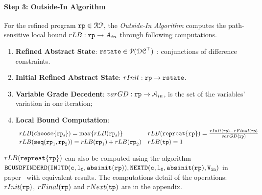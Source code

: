   \paragraph{Step 3: Outside-In Algorithm}
  For the refined program $\mathtt{rp} \in \mathcal{RP}$, the \emph{Outside-In Algorithm}
  computes the path-sensitive local bound 
  $rLB: \mathtt{rp} \to \mathcal{A}_{in}$ through following computations.
  \begin{enumerate}
  \item \textbf{{Refined Abstract State}}: 
  $\mathtt{rstate} \in \mathcal{P}(\mathcal{DC}^{\top})$ : conjunctions of difference constraints.
  \item \textbf{Initial Refined Abstract State}: $rInit : \mathtt{rp} \to \mathtt{rstate} $.
  \item \textbf{Variable Grade Decedent}: $varGD : \mathtt{rp} \to \mathcal{A}_{in}$, is the set of the variables' variation in one iteration;
  \item \textbf{Local Bound Computation}: 
  \[
   \begin{array}{ll}
   rLB(\mathtt{choose}\{\mathtt{rp}_i\}) = \max\{rLB(\mathtt{rp}_i)\}
   &
   rLB(\mathtt{repreat}\{\mathtt{rp}\}) = \frac{rInit(\mathtt{rp}) - rFinal(\mathtt{rp})}{varGD(\mathtt{rp})}
   \\
   rLB(\mathtt{seq}(\mathtt{rp}_1, \mathtt{rp}_2)) = rLB(\mathtt{rp}_1)+ rLB( \mathtt{rp}_2)
   &
   rLB(\mathtt{tp}) = 1
   \end{array}
  \]
  \end{enumerate}
  $rLB(\mathtt{repreat}\{\mathtt{rp}\})$ can also be computed using the algorithm 
  $\mathtt{BOUNDFINDERD(INITD(c, l_0, \mathtt{abs}{\mathtt{init}}(\mathtt{rp})), NEXTD(c, l_0, \mathtt{abs}{\mathtt{init}}(\mathtt{rp}), V_{\mathtt{in}} )}$ 
  in paper~\cite{GulwaniJK09} with equivalent results.
  The computations detail of the operations: $rInit(\mathtt{rp})$,
  $rFinal(\mathtt{rp})$ and $rNext(\mathtt{tp})$
  are in the appendix.
